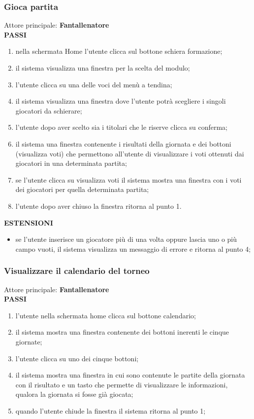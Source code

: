 \documentclass[12pt,a4paper]{article}
\begin{document}
\subsubsection{Gioca partita}
Attore principale: \textbf{Fantallenatore}\\
\newline
\textbf{PASSI}
\begin{enumerate}
\item nella schermata Home l'utente clicca sul bottone schiera formazione;
\item il sistema visualizza una finestra per la scelta del modulo;
\item l'utente clicca su una delle voci del menù a tendina;
\item il sistema visualizza una finestra dove l'utente potrà scegliere i singoli giocatori da schierare;
\item l'utente dopo aver scelto sia i titolari che le riserve clicca su conferma;
\item il sistema  una finestra contenente i risultati della giornata e dei bottoni (visualizza voti) che permettono all'utente di visualizzare i voti ottenuti dai giocatori in una determinata partita;
\item se l'utente clicca su visualizza voti il sistema mostra una finestra con i voti dei giocatori per quella determinata partita;
\item l'utente dopo aver chiuso la finestra ritorna al punto 1.
\end{enumerate}
\textbf{ESTENSIONI}
\begin{itemize}
\item se l'utente inserisce un giocatore più di una volta oppure lascia uno o più campo vuoti, il sistema visualizza un messaggio di errore e ritorna al punto 4;
\end{itemize}
\subsubsection{Visualizzare il calendario del torneo}
Attore principale: \textbf{Fantallenatore}\\
\newline
\textbf{PASSI}
\begin{enumerate}
\item l'utente nella schermata home clicca sul bottone calendario;
\item il sistema mostra una finestra contenente dei bottoni inerenti le cinque giornate;
\item l'utente clicca su uno dei cinque bottoni;
\item il sistema mostra una finestra in cui sono contenute le partite della giornata con il risultato e un tasto che permette di visualizzare le informazioni, qualora la giornata si fosse già giocata;
\item quando l'utente chiude la finestra il sistema ritorna al punto 1;
\end{enumerate}
\end{document}
